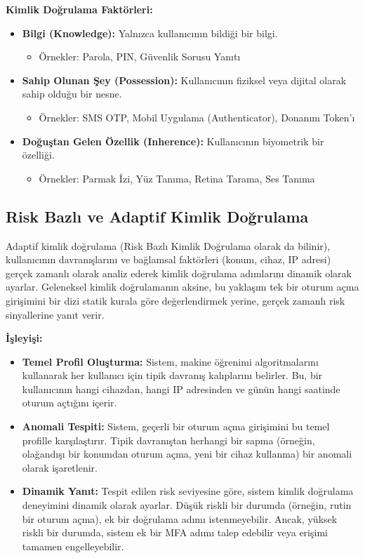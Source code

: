 \textbf{Kimlik Doğrulama Faktörleri:}
\begin{itemize}
    \item \textbf{Bilgi (Knowledge):} Yalnızca kullanıcının bildiği bir bilgi.
    \begin{itemize}
        \item Örnekler: Parola, PIN, Güvenlik Sorusu Yanıtı
    \end{itemize}
    
    \item \textbf{Sahip Olunan Şey (Possession):} Kullanıcının fiziksel veya dijital olarak sahip olduğu bir nesne.
    \begin{itemize}
        \item Örnekler: SMS OTP, Mobil Uygulama (Authenticator), Donanım Token'ı
    \end{itemize}
    
    \item \textbf{Doğuştan Gelen Özellik (Inherence):} Kullanıcının biyometrik bir özelliği.
    \begin{itemize}
        \item Örnekler: Parmak İzi, Yüz Tanıma, Retina Tarama, Ses Tanıma
    \end{itemize}
\end{itemize}

\subsection{Risk Bazlı ve Adaptif Kimlik Doğrulama}

Adaptif kimlik doğrulama (Risk Bazlı Kimlik Doğrulama olarak da bilinir), kullanıcının davranışlarını ve bağlamsal faktörleri (konum, cihaz, IP adresi) gerçek zamanlı olarak analiz ederek kimlik doğrulama adımlarını dinamik olarak ayarlar. Geleneksel kimlik doğrulamanın aksine, bu yaklaşım tek bir oturum açma girişimini bir dizi statik kurala göre değerlendirmek yerine, gerçek zamanlı risk sinyallerine yanıt verir.

\textbf{İşleyişi:}
\begin{itemize}
    \item \textbf{Temel Profil Oluşturma:} Sistem, makine öğrenimi algoritmalarını kullanarak her kullanıcı için tipik davranış kalıplarını belirler. Bu, bir kullanıcının hangi cihazdan, hangi IP adresinden ve günün hangi saatinde oturum açtığını içerir.
    \item \textbf{Anomali Tespiti:} Sistem, geçerli bir oturum açma girişimini bu temel profille karşılaştırır. Tipik davranıştan herhangi bir sapma (örneğin, olağandışı bir konumdan oturum açma, yeni bir cihaz kullanma) bir anomali olarak işaretlenir.
    \item \textbf{Dinamik Yanıt:} Tespit edilen risk seviyesine göre, sistem kimlik doğrulama deneyimini dinamik olarak ayarlar. Düşük riskli bir durumda (örneğin, rutin bir oturum açma), ek bir doğrulama adımı istenmeyebilir. Ancak, yüksek riskli bir durumda, sistem ek bir MFA adımı talep edebilir veya erişimi tamamen engelleyebilir.
\end{itemize}

